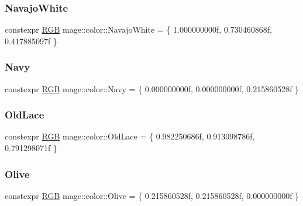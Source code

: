 \hypertarget{namespacemage_1_1color_a900d3e18327610b3a28909a4e2e0f28a}{}\label{namespacemage_1_1color_a900d3e18327610b3a28909a4e2e0f28a} 
\subsubsection{\texorpdfstring{Navajo\+White}{NavajoWhite}}
{\footnotesize\ttfamily constexpr \hyperlink{structmage_1_1_r_g_b}{R\+GB} mage\+::color\+::\+Navajo\+White = \{ 1.\+000000000f, 0.\+730460868f, 0.\+417885097f \}}

\hypertarget{namespacemage_1_1color_a61827d5a9d3b434155ba49592e474222}{}\label{namespacemage_1_1color_a61827d5a9d3b434155ba49592e474222} 
\subsubsection{\texorpdfstring{Navy}{Navy}}
{\footnotesize\ttfamily constexpr \hyperlink{structmage_1_1_r_g_b}{R\+GB} mage\+::color\+::\+Navy = \{ 0.\+000000000f, 0.\+000000000f, 0.\+215860528f \}}

\hypertarget{namespacemage_1_1color_a7c9fc63a81fb81315a77b6a031a5309f}{}\label{namespacemage_1_1color_a7c9fc63a81fb81315a77b6a031a5309f} 
\subsubsection{\texorpdfstring{Old\+Lace}{OldLace}}
{\footnotesize\ttfamily constexpr \hyperlink{structmage_1_1_r_g_b}{R\+GB} mage\+::color\+::\+Old\+Lace = \{ 0.\+982250686f, 0.\+913098786f, 0.\+791298071f \}}

\hypertarget{namespacemage_1_1color_a7e1414ce4e2b7db430d55135da40fe57}{}\label{namespacemage_1_1color_a7e1414ce4e2b7db430d55135da40fe57} 
\subsubsection{\texorpdfstring{Olive}{Olive}}
{\footnotesize\ttfamily constexpr \hyperlink{structmage_1_1_r_g_b}{R\+GB} mage\+::color\+::\+Olive = \{ 0.\+215860528f, 0.\+215860528f, 0.\+000000000f \}}

